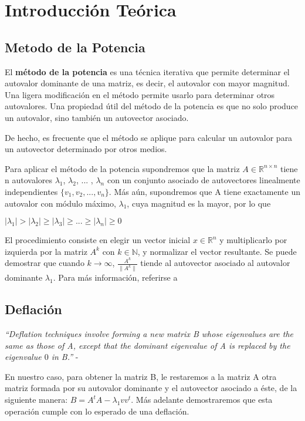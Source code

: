 \section{Introducci\'on Te\'orica}
\subsection{Metodo de la Potencia}
El \textbf{método de la potencia} es una técnica iterativa que permite determinar el autovalor dominante de una matriz, es decir, el autovalor con mayor magnitud. Una ligera modificación en el método permite usarlo para determinar otros autovalores. Una propiedad útil del método de la potencia es que no solo produce un autovalor, sino también un autovector asociado. 

De hecho, es frecuente que el método se aplique para calcular un autovalor para un autovector determinado por otros medios.

Para aplicar el método de la potencia supondremos que la matriz $A \in \mathbb{R}^{n \times n}$ tiene n autovalores $\lambda_1$, $\lambda_2$, ... , $\lambda_n$ con un conjunto asociado de autovectores linealmente independientes $\{v_1,v_2, ..., v_n\}$. Más aún, supondremos que A tiene exactamente un autovalor con módulo máximo, $\lambda_1$, cuya magnitud es la mayor, por lo que 
\begin{center}
$|\lambda_1| > |\lambda_2| \geq |\lambda_3| \geq ... \geq |\lambda_n| \geq 0$
\end{center}

%
%
%
%
%
%

El procedimiento consiste en elegir un vector inicial $x \in \mathbb{R}^n$ y multiplicarlo por
izquierda por la matriz $A^k$ con $k \in \mathbb{N}$, y normalizar el vector resultante. Se puede
demostrar que cuando $k \rightarrow \infty$, $\frac{A^k}{\| A^k \| }$ tiende al autovector asociado
al autovalor  dominante $\lambda_1$. Para más información, referirse a \cite{burden}

\subsection{Deflación}

\textit{``Deflation techniques involve forming a new matrix B whose eigenvalues are the same as
  those of A, except that the dominant eigenvalue of A is replaced by the eigenvalue $0$ in B.''} -
\cite[p.~604]{burden}

En nuestro caso, para obtener la matriz B, le restaremos a la matriz A otra matriz formada por su
autovalor dominante y el autovector asociado a éste, de la siguiente manera: $B = A^t A -
\lambda_{1} v v^t $. Más adelante demostraremos que esta operación cumple con lo esperado de una
deflación.
